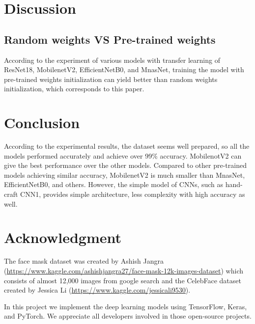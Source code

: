 \documentclass[conference]{IEEEtran}
\begin{document}
\section{Discussion}
\subsection{Random weights VS Pre-trained weights}
According to the experiment of various models with transfer learning of ResNet18, MobilenetV2, EfficientNetB0, and MnasNet, training the model with pre-trained weights initialization can yield better than random weights initialization, which corresponds to this paper\cite{kornblith2019better}.


\section{Conclusion}
According to the experimental results, the dataset seems well prepared, so all the models performed accurately and achieve over 99\% accuracy. MobilenotV2 can give the best performance over the other models. Compared to other pre-trained models achieving similar accuracy, MobilenetV2 is much smaller than MnasNet, EfficientNetB0, and others. However, the simple model of CNNs, such as hand-craft CNN1, provides simple architecture, less complexity with high accuracy as well.

\section*{Acknowledgment}

The face mask dataset was created by Ashish Jangra (\url{https://www.kaggle.com/ashishjangra27/face-mask-12k-images-dataset}) which consists of almost 12,000 images from google search and the CelebFace dataset created by Jessica Li (\url{https://www.kaggle.com/jessicali9530}). 

In this project we implement the deep learning models using TensorFlow, Keras, and PyTorch. We appreciate all developers involved in those open-source projects. 



\printbibliography
\end{document}
